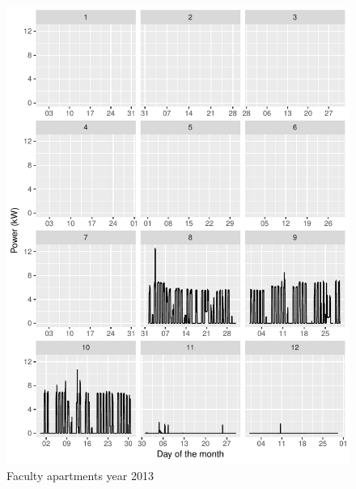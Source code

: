 \documentclass[11pt, oneside]{article}   	%
\begin{document}
\begin{figure}
\includegraphics[keepaspectratio]{fac_build_Y2013.pdf}
\caption{Faculty apartments  year 2013 }
\end{figure}
\end{document}
